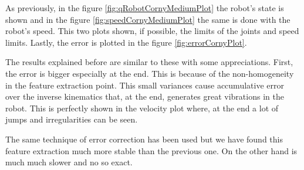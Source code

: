		As previously, in the figure \ref{fig:qRobotCornyMediumPlot} the robot's state is shown and in the figure \ref{fig:speedCornyMediumPlot} the same is done with the robot's speed. This two plots shown, if possible, the limits of the joints and speed limits. Lastly, the error is plotted in the figure \ref{fig:errorCornyPlot}.

		\ifx \plots \yes
			\qRobotCornyMediumPlot
		\fi

		\ifx \plots \yes
			\speedCornyMediumPlot
		\fi

		\ifx \plots \yes
			\errorCornyPlot
		\fi

		The results explained before are similar to these with some appreciations. First, the error is bigger especially at the end. This is because of the non-homogeneity in the feature extraction point. This small variances cause accumulative error over the inverse kinematics that, at the end, generates great vibrations in the robot.
		This is perfectly shown in the velocity plot where, at the end a lot of jumps and irregularities can be seen.

		The same technique of error correction has been used but we have found this feature extraction much more stable than the previous one. On the other hand is much much slower and no so exact.
